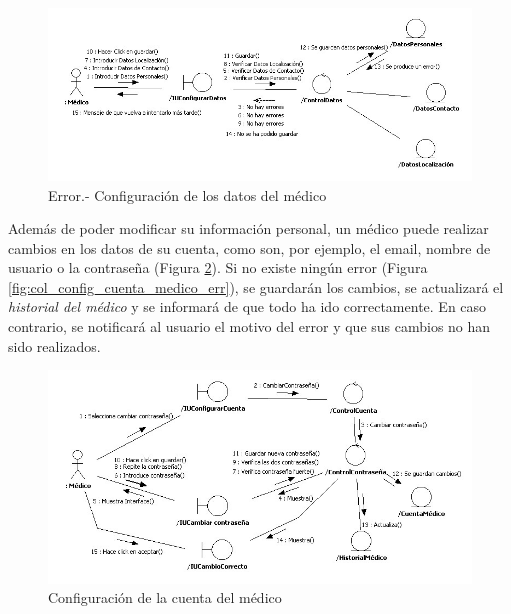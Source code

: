 		\bigskip
		\bigskip
		\bigskip
		\begin{figure}[H]
		  \centering
		    \includegraphics[width=16cm]{img/jpg/colaboraciones/3_ConfiguracionDatosMedicoError2.jpg}
		  \caption{Error.- Configuración de los datos del médico}
		  \label{fig:col_config_dat_medico_err2}
		\end{figure}
		
		\newpage
		
		Además de poder modificar su información personal, un médico puede realizar cambios en los datos de su cuenta, como son, por ejemplo, el email, nombre de usuario o la contraseña (Figura \ref{fig:col_config_cuenta_medico}). Si no existe ningún error (Figura \ref{fig:col_config_cuenta_medico_err}), se guardarán los cambios, se actualizará el \textit{historial del médico} y se informará de que todo ha ido correctamente. En caso contrario, se notificará al usuario el motivo del error y que sus cambios no han sido realizados.
		\begin{figure}[H]
		  \centering
		    \includegraphics[width=16cm]{img/jpg/colaboraciones/4_ConfiguracionCuentaMedico.jpg}
		  \caption{Configuración de la cuenta del médico}
		  \label{fig:col_config_cuenta_medico}
		\end{figure}
		
